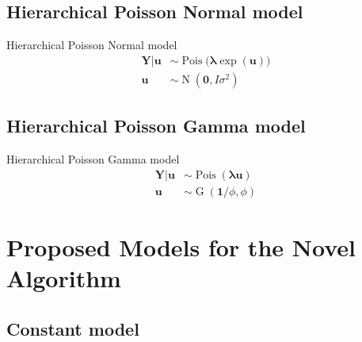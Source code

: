 \documentclass[aspectratio=169]{beamer}
\DeclareMathOperator{\G}{G}
\DeclareMathOperator{\N}{N}
\DeclareMathOperator{\Pois}{Pois}
\begin{document}
\hypertarget{hierarchical-poisson-normal-model}{%
\subsection{Hierarchical Poisson Normal
model}\label{hierarchical-poisson-normal-model}}

\begin{frame}{Hierarchical Poisson Normal model}
\begin{subequations} \label{eq:PoisN}
  \begin{alignat}{2}
    \boldsymbol{Y|u} &\sim \Pois \big( \boldsymbol{\lambda} \exp(\boldsymbol{u}) \big) \label{eq:pois_n0} \\ 
    \boldsymbol{u} &\sim \N(\boldsymbol{0},I\sigma^2) \label{eq:pois_n1}
  \end{alignat}
\end{subequations}
\end{frame}

\hypertarget{hierarchical-poisson-gamma-model}{%
\subsection{Hierarchical Poisson Gamma
model}\label{hierarchical-poisson-gamma-model}}

\begin{frame}{Hierarchical Poisson Gamma model}
\begin{subequations} \label{eq:PoisGam}
  \begin{alignat}{2}
    \boldsymbol{Y|u} &\sim \Pois (\boldsymbol{\lambda u}) \label{eq:pois_g0} \\ 
    \boldsymbol{u} &\sim \G(\boldsymbol 1/\phi,\phi) \label{eq:pois_g1}
  \end{alignat}
\end{subequations}
\end{frame}

\hypertarget{proposed-models-for-the-novel-algorithm}{%
\section{Proposed Models for the Novel
Algorithm}\label{proposed-models-for-the-novel-algorithm}}

\hypertarget{constant-model}{%
\subsection{Constant model}\label{constant-model}}
\end{document}
